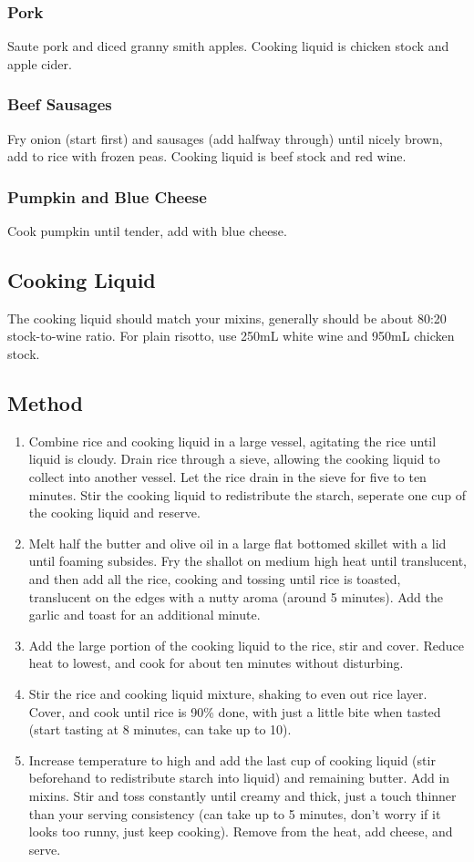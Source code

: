 \begin{multicols}{2}
    \subsubsection{Pork}
      Saute pork and diced granny smith apples. Cooking liquid is chicken stock and apple cider.
    \subsubsection{Beef Sausages}
      Fry onion (start first) and sausages (add halfway through) until nicely brown, add to rice with frozen peas. Cooking liquid is beef stock and red wine.
    \subsubsection{Pumpkin and Blue Cheese}
      Cook pumpkin until tender, add with blue cheese.
  \vfill\null
  \columnbreak
  \subsection{Cooking Liquid}
  The cooking liquid should match your mixins, generally should be about 80:20 stock-to-wine ratio. For plain risotto, use 250mL white wine and 950mL chicken stock.

  \subsection{Method}
    \begin{enumerate}
      \item Combine rice and cooking liquid in a large vessel, agitating the rice until liquid is cloudy. Drain rice through a sieve, allowing the cooking liquid to collect into another vessel. Let the rice drain in the sieve for five to ten minutes. Stir the cooking liquid to redistribute the starch, seperate one cup of the cooking liquid and reserve.
      \item Melt half the butter and olive oil in a large flat bottomed skillet with a lid until foaming subsides. Fry the shallot on medium high heat until translucent, and then add all the rice, cooking and tossing until rice is toasted, translucent on the edges with a nutty aroma (around 5 minutes). Add the garlic and toast for an additional minute.
      \item Add the large portion of the cooking liquid to the rice, stir and cover. Reduce heat to lowest, and cook for about ten minutes without disturbing.
      \item Stir the rice and cooking liquid mixture, shaking to even out rice layer. Cover, and cook until rice is 90\% done, with just a little bite when tasted (start tasting at 8 minutes, can take up to 10).
      \item Increase temperature to high and add the last cup of cooking liquid (stir beforehand to redistribute starch into liquid) and remaining butter. Add in mixins. Stir and toss constantly until creamy and thick, just a touch thinner than your serving consistency (can take up to 5 minutes, don’t worry if it looks too runny, just keep cooking). Remove from the heat, add cheese, and serve.
    \end{enumerate}
  \end{multicols}

